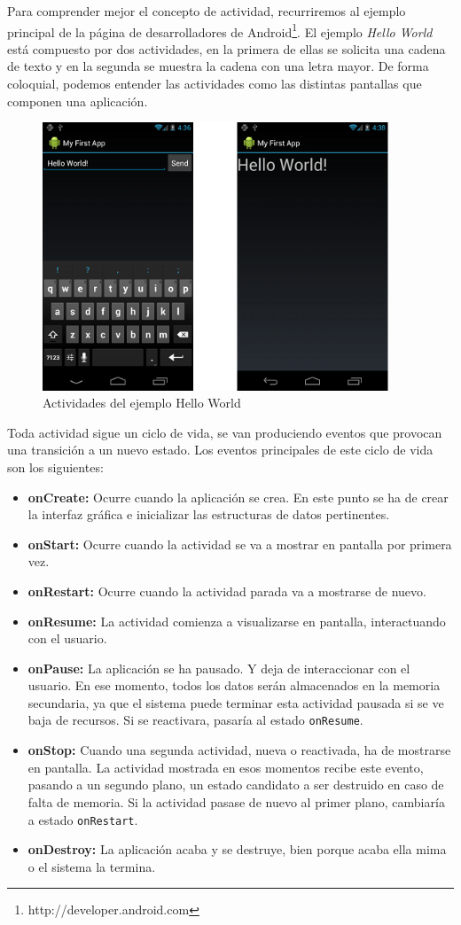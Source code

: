 Para comprender mejor el concepto de actividad, recurriremos al ejemplo principal de la página de desarrolladores de Android\footnote{http://developer.android.com}. El ejemplo \emph{Hello World} está compuesto por dos actividades, en la primera de ellas se solicita una cadena de texto y en la segunda se muestra la cadena con una letra mayor.  De forma coloquial, podemos entender las actividades como las distintas pantallas que componen una aplicación.

\begin{figure}[!h]
\centering
\includegraphics[height=8cm]{imagenes/capitulo2/firstapp.png}
\caption{Actividades del ejemplo Hello World}
\end{figure}

Toda actividad sigue un ciclo de vida, se van produciendo eventos que provocan una transición a un nuevo estado. Los eventos principales de este ciclo de vida son los siguientes:

\begin{itemize}
\item \textbf{onCreate:} Ocurre cuando la aplicación se crea. En este punto se ha de crear la interfaz gráfica e inicializar las estructuras de datos pertinentes.
\item \textbf{onStart:} Ocurre cuando la actividad se va a mostrar en pantalla por primera vez.
\item \textbf{onRestart:} Ocurre cuando la actividad parada va a mostrarse de nuevo.
\item \textbf{onResume:} La actividad comienza a visualizarse en pantalla, interactuando con el usuario.
\item \textbf{onPause:} La aplicación se ha pausado. Y deja de interaccionar con el usuario. En ese momento, todos los datos serán almacenados en la memoria secundaria, ya que el sistema puede terminar esta actividad pausada si se ve baja de recursos. Si se reactivara, pasaría al estado \texttt{onResume}.
\item \textbf{onStop:} Cuando una segunda actividad, nueva o reactivada, ha de mostrarse en pantalla. La actividad mostrada en esos momentos recibe este evento, pasando a un segundo plano, un estado candidato a ser destruido en caso de falta de memoria. Si la actividad pasase de nuevo al primer plano, cambiaría a estado \texttt{onRestart}.
\item \textbf{onDestroy:} La aplicación acaba y se destruye, bien porque acaba ella mima o el sistema la termina.
\end{itemize}

